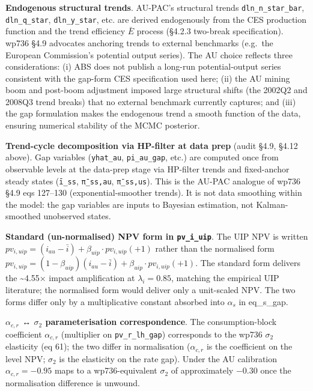 \documentclass[
]{article}
\begin{document}
\textbf{Endogenous structural trends}. AU-PAC's structural trends
\texttt{dln\_n\_star\_bar}, \texttt{dln\_q\_star},
\texttt{dln\_y\_star}, etc. are derived endogenously from the CES
production function and the trend efficiency \(\bar{E}\) process (§4.2.3
two-break specification). wp736 §4.9 advocates anchoring trends to
external benchmarks (e.g.~the European Commission's potential output
series). The AU choice reflects three considerations: (i) ABS does not
publish a long-run potential-output series consistent with the gap-form
CES specification used here; (ii) the AU mining boom and post-boom
adjustment imposed large structural shifts (the 2002Q2 and 2008Q3 trend
breaks) that no external benchmark currently captures; and (iii) the gap
formulation makes the endogenous trend a smooth function of the data,
ensuring numerical stability of the MCMC posterior.

\textbf{Trend-cycle decomposition via HP-filter at data prep} (audit
§4.9, §4.12 above). Gap variables (\texttt{yhat\_au},
\texttt{pi\_au\_gap}, etc.) are computed once from observable levels at
the data-prep stage via HP-filter trends and fixed-anchor steady states
(\texttt{ī\_ss}, \texttt{π̄\_ss,au}, \texttt{π̄\_ss,us}). This is the
AU-PAC analogue of wp736 §4.9 eqs 127--130 (exponential-smoother
trends). It is not data smoothing within the model: the gap variables
are inputs to Bayesian estimation, not Kalman-smoothed unobserved
states.

\textbf{Standard (un-normalised) NPV form in \texttt{pv\_i\_uip}}. The
UIP NPV is written
\(pv_{i,uip} = (i_{au} - \bar{i}) + \beta_{uip} \cdot pv_{i,uip}(+1)\)
rather than the normalised form
\(pv_{i,uip} = (1-\beta_{uip})(i_{au} - \bar{i}) + \beta_{uip} \cdot pv_{i,uip}(+1)\).
The standard form delivers the \textasciitilde4.55× impact amplification
at \(\lambda_i = 0.85\), matching the empirical UIP literature; the
normalised form would deliver only a unit-scaled NPV. The two forms
differ only by a multiplicative constant absorbed into \(\alpha_s\) in
eq\_s\_gap.

\textbf{\(\alpha_{c,r}\) ↔ \(\sigma_2\) parameterisation
correspondence}. The consumption-block coefficient \(\alpha_{c,r}\)
(multiplier on \texttt{pv\_r\_lh\_gap}) corresponds to the wp736
\(\sigma_2\) elasticity (eq 61); the two differ in normalisation
(\(\alpha_{c,r}\) is the coefficient on the level NPV; \(\sigma_2\) is
the elasticity on the rate gap). Under the AU calibration
\(\alpha_{c,r} = -0.95\) maps to a wp736-equivalent \(\sigma_2\) of
approximately \(-0.30\) once the normalisation difference is unwound.
\end{document}
